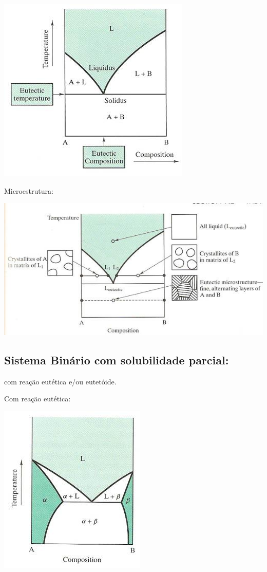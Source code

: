 \includegraphics[scale=0.4,trim={0 0 0 0}]{figures/semQ}

Microestrutura:

\includegraphics[scale=0.3,trim={0 0 0 0}]{figures/microSemQ}


\subsection{Sistema Binário com solubilidade parcial:} 

com reação eutética e/ou eutetóide.

Com reação eutética:

\includegraphics[scale=0.4,trim={0 0 0 0}]{figures/eute}

